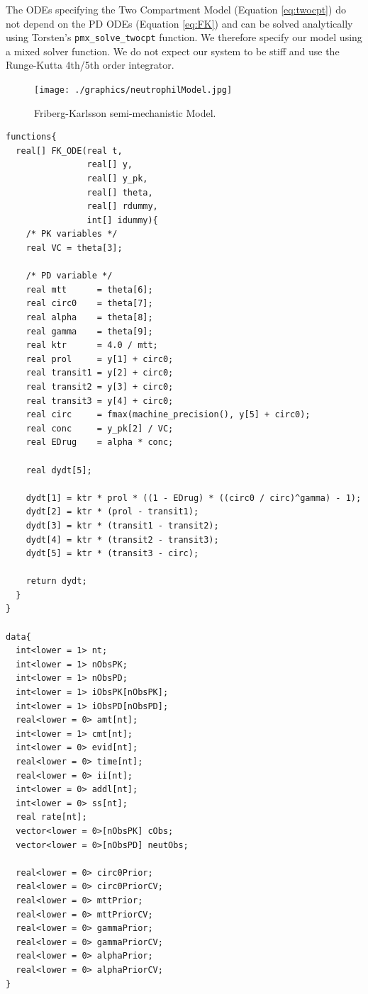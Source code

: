 \documentclass[11pt, reqno, oneside]{amsbook}
\numberwithin{equation}{chapter}
\numberwithin{figure}{chapter}
\numberwithin{table}{chapter}
\theoremstyle{remark}
\begin{document}
The ODEs specifying the Two Compartment Model
(Equation \eqref{eq:twocpt}) do not depend on the PD ODEs
(Equation \eqref{eq:FK}) and can be solved analytically
using Torsten's \texttt{pmx_solve_twocpt} function. We
therefore specify our model using a mixed solver function. We do not
expect our system to be stiff and use the Runge-Kutta 4th/5th order
integrator.

\begin{figure}[htbp]
\centering
\texttt{[image: ./graphics/neutrophilModel.jpg]}
\caption{\label{fig:org6b46885}
Friberg-Karlsson semi-mechanistic Model.}
\end{figure}

\begin{verbatim}
functions{
  real[] FK_ODE(real t,
                real[] y,
                real[] y_pk,
                real[] theta,
                real[] rdummy,
                int[] idummy){
    /* PK variables */
    real VC = theta[3];

    /* PD variable */
    real mtt      = theta[6];
    real circ0    = theta[7];
    real alpha    = theta[8];
    real gamma    = theta[9];
    real ktr      = 4.0 / mtt;
    real prol     = y[1] + circ0;
    real transit1 = y[2] + circ0;
    real transit2 = y[3] + circ0;
    real transit3 = y[4] + circ0;
    real circ     = fmax(machine_precision(), y[5] + circ0);
    real conc     = y_pk[2] / VC;
    real EDrug    = alpha * conc;

    real dydt[5];

    dydt[1] = ktr * prol * ((1 - EDrug) * ((circ0 / circ)^gamma) - 1);
    dydt[2] = ktr * (prol - transit1);
    dydt[3] = ktr * (transit1 - transit2);
    dydt[4] = ktr * (transit2 - transit3);
    dydt[5] = ktr * (transit3 - circ);

    return dydt;
  }
}

data{
  int<lower = 1> nt;
  int<lower = 1> nObsPK;
  int<lower = 1> nObsPD;
  int<lower = 1> iObsPK[nObsPK];
  int<lower = 1> iObsPD[nObsPD];
  real<lower = 0> amt[nt];
  int<lower = 1> cmt[nt];
  int<lower = 0> evid[nt];
  real<lower = 0> time[nt];
  real<lower = 0> ii[nt];
  int<lower = 0> addl[nt];
  int<lower = 0> ss[nt];
  real rate[nt];
  vector<lower = 0>[nObsPK] cObs;
  vector<lower = 0>[nObsPD] neutObs;

  real<lower = 0> circ0Prior;
  real<lower = 0> circ0PriorCV;
  real<lower = 0> mttPrior;
  real<lower = 0> mttPriorCV;
  real<lower = 0> gammaPrior;
  real<lower = 0> gammaPriorCV;
  real<lower = 0> alphaPrior;
  real<lower = 0> alphaPriorCV;
}


\end{verbatim}
\end{document}
